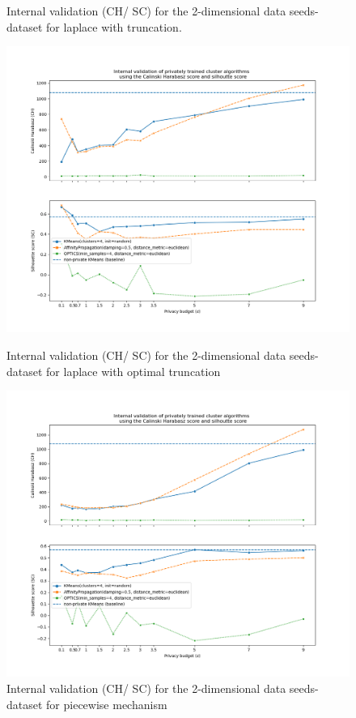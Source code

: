 \begin{figure}[H]
\begin{minipage}[c]{0.49\textwidth}
        \caption{Internal validation (CH/ SC) for the 2-dimensional data seeds-dataset for laplace with truncation.}
        \label{fig:appendix-internal-validation-seeds-dataset_comparison_2d-laplace-truncated}
    \end{minipage}
    \begin{minipage}[c]{0.49\textwidth}
        \includegraphics[width=1\textwidth]{Results/2d-laplace-optimal-truncated/seeds-dataset/ch-and-sc.png}
        \caption{Internal validation (CH/ SC) for the 2-dimensional data seeds-dataset for laplace with optimal truncation}
        \label{fig:appendix-internal-validation-seeds-dataset_comparison_2d-laplace-optimal-truncated}
    \end{minipage}
    \begin{minipage}[c]{0.49\textwidth}
        \includegraphics[width=1\textwidth]{Results/2d-piecewise/seeds-dataset/ch-and-sc.png}
        \caption{Internal validation (CH/ SC) for the 2-dimensional data seeds-dataset for piecewise mechanism}
        \label{fig:appendix-internal-validation-seeds-dataset_comparison_2d-piecewise}
    \end{minipage}
\end{figure}


